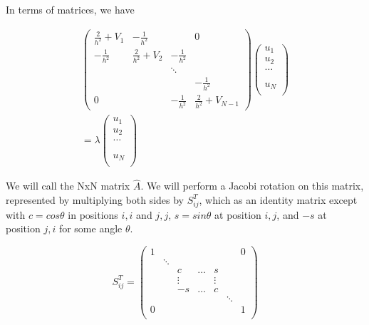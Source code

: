 \documentclass[twocolumn, groupedaddress]{revtex4-1}
\begin{document}
In terms of matrices, we have

\begin{align}
\left( \begin{array}{cccc}
\frac{2}{h^2} + V_1  &    -\frac{1}{h^2}   &                &            0            \\
   -\frac{1}{h^2}    & \frac{2}{h^2} + V_2 & -\frac{1}{h^2} &                         \\
                     &                     &     \ddots     &                         \\
                     &                     &                &     -\frac{1}{h^2}      \\
         0           &                     & -\frac{1}{h^2} & \frac{2}{h^2} + V_{N-1}
\end{array} \right)
\left( \begin{array}{cccc}
 u_1  \\
 u_2  \\
\dots \\
      \\
      \\
u_{N} \\
\end{array} \right)									\nonumber \\
 = \lambda
\left( \begin{array}{cccc}
 u_1  \\
 u_2  \\
\dots \\
      \\
      \\
u_{N} \\
\end{array} \right)
\end{align}

We will call the NxN matrix $\hat{A}$. We will perform a Jacobi rotation on this matrix, represented by multiplying both sides by $S_{ij}^T$, which as an identity matrix except with $c=cos\theta$ in positions $i,i$ and $j,j$, $s=sin\theta$ at position $i,j$, and $-s$ at position $j,i$ for some angle $\theta$.

\begin{equation}
S_{ij}^T = 
\left( \begin{array}{ccccccc}
1 &       &       &       &       &     &        0 \\
	 &\ddots &     &       &       &     &              \\
	 &       &  c    & \dots&  s    &     &              \\
	 &       &\vdots &       & \vdots&     &              \\
	 &       &   -s  & \dots &   c   &     &              \\
	 &       &       &       &       &\ddots&             \\
0 &       &       &       &       &     &   1  \\
\end{array} \right)
\end{equation} 
\end{document}
